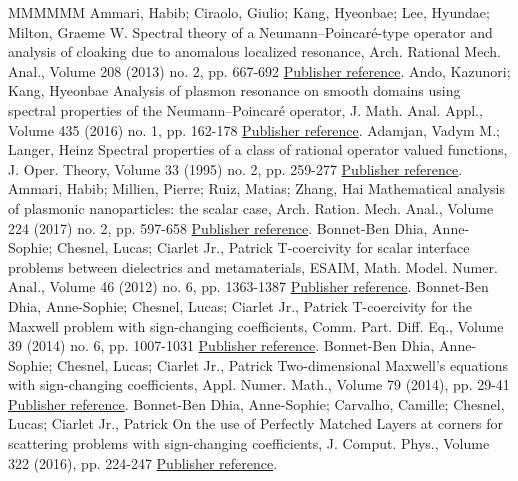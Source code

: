 \documentclass[11pt]{article}
\theoremstyle{definition}
\numberwithin{equation}{section}
\numberwithin{figure}{section}
\numberwithin{table}{section}
\begin{document}
\begin{thebibliography}{MMMMMM}
 Ammari, Habib; Ciraolo, Giulio; Kang, Hyeonbae; Lee, Hyundae; Milton, Graeme W. Spectral theory of a Neumann–Poincaré-type operator and analysis of cloaking due to anomalous localized resonance, Arch. Rational Mech. Anal., Volume 208 (2013) no. 2, pp. 667-692 \href{https://ahl.centre-mersenne.org/item/AHL_2020__3__1161_0/#Amm-etal-13}{Publisher reference}.
 Ando, Kazunori; Kang, Hyeonbae Analysis of plasmon resonance on smooth domains using spectral properties of the Neumann–Poincaré operator, J. Math. Anal. Appl., Volume 435 (2016) no. 1, pp. 162-178 \href{https://ahl.centre-mersenne.org/item/AHL_2020__3__1161_0/#And-Kan-16}{Publisher reference}.
 Adamjan, Vadym M.; Langer, Heinz Spectral properties of a class of rational operator valued functions, J. Oper. Theory, Volume 33 (1995) no. 2, pp. 259-277 \href{https://ahl.centre-mersenne.org/item/AHL_2020__3__1161_0/#Ada-Lan-95}{Publisher reference}.
 Ammari, Habib; Millien, Pierre; Ruiz, Matias; Zhang, Hai Mathematical analysis of plasmonic nanoparticles: the scalar case, Arch. Ration. Mech. Anal., Volume 224 (2017) no. 2, pp. 597-658 \href{https://ahl.centre-mersenne.org/item/AHL_2020__3__1161_0/#Amm-Mil-Rui-Zha-17}{Publisher reference}.
 Bonnet-Ben Dhia, Anne-Sophie; Chesnel, Lucas; Ciarlet Jr., Patrick T-coercivity for scalar interface problems between dielectrics and metamaterials, ESAIM, Math. Model. Numer. Anal., Volume 46 (2012) no. 6, pp. 1363-1387 \href{https://ahl.centre-mersenne.org/item/AHL_2020__3__1161_0/#Bon-Che-Cia-12}{Publisher reference}.
 Bonnet-Ben Dhia, Anne-Sophie; Chesnel, Lucas; Ciarlet Jr., Patrick T-coercivity for the Maxwell problem with sign-changing coefficients, Comm. Part. Diff. Eq., Volume 39 (2014) no. 6, pp. 1007-1031 \href{https://ahl.centre-mersenne.org/item/AHL_2020__3__1161_0/#Bon-Che-Cia-14a}{Publisher reference}.
 Bonnet-Ben Dhia, Anne-Sophie; Chesnel, Lucas; Ciarlet Jr., Patrick Two-dimensional Maxwell’s equations with sign-changing coefficients, Appl. Numer. Math., Volume 79 (2014), pp. 29-41 \href{https://ahl.centre-mersenne.org/item/AHL_2020__3__1161_0/#Bon-Che-Cia-14b}{Publisher reference}.
 Bonnet-Ben Dhia, Anne-Sophie; Carvalho, Camille; Chesnel, Lucas; Ciarlet Jr., Patrick On the use of Perfectly Matched Layers at corners for scattering problems with sign-changing coefficients, J. Comput. Phys., Volume 322 (2016), pp. 224-247 \href{https://ahl.centre-mersenne.org/item/AHL_2020__3__1161_0/#Bon-etal-16}{Publisher reference}.

\end{thebibliography}
\end{document}
